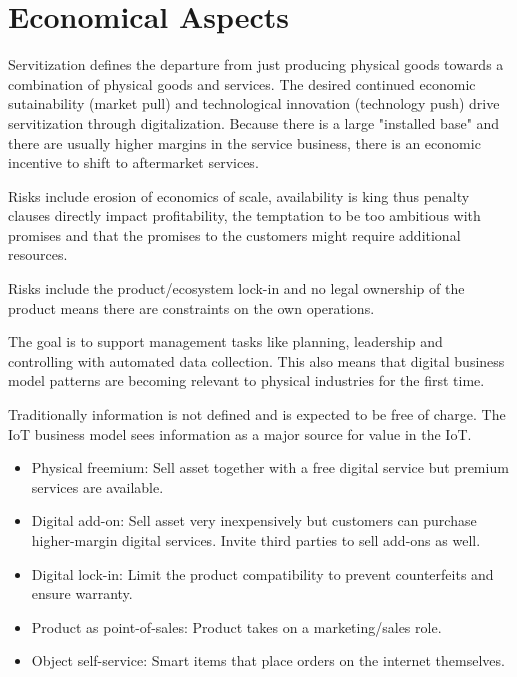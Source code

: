 \section{Economical Aspects}
\begin{mytitle}[Servitization] Servitization defines the departure from just producing physical goods towards a combination of physical goods and services. The desired continued economic sutainability (market pull) and technological innovation (technology push) drive servitization through digitalization. Because there is a large "installed base" and there are usually higher margins in the service business, there is an economic incentive to shift to aftermarket services.
\end{mytitle}
\begin{mytitle}
    \begin{mysubtitle} Risks include erosion of economics of scale, availability is king thus penalty clauses directly impact profitability, the temptation to be too ambitious with promises and that the promises to the customers might require additional resources.
    \end{mysubtitle}
    \begin{mysubtitle} Risks include the product/ecosystem lock-in and no legal ownership of the product means there are constraints on the own operations.
    \end{mysubtitle}
\end{mytitle}

\begin{mytitle} The goal is to support management tasks like planning, leadership and controlling with automated data collection. This also means that digital business model patterns are becoming relevant to physical industries for the first time. 
\end{mytitle}
\begin{myremark} Traditionally information is not defined and is expected to be free of charge. The IoT business model sees information as a major source for value in the IoT.
\end{myremark}
\begin{mytitle}\hfill
\begin{itemize}
    \item Physical freemium: Sell asset together with a free digital service but premium services are available.
    \item Digital add-on: Sell asset very inexpensively but customers can purchase higher-margin digital services. Invite third parties to sell add-ons as well.
    \item Digital lock-in: Limit the product compatibility to prevent counterfeits and ensure warranty.
    \item Product as point-of-sales: Product takes on a marketing/sales role.
    \item Object self-service: Smart items that place orders on the internet themselves.
\end{itemize}
\end{mytitle}